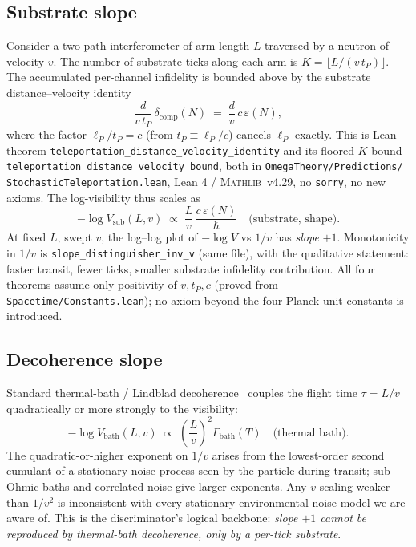 \documentclass[aps,prl,twocolumn,superscriptaddress,nofootinbib,10pt]{revtex4-2}
\newcommand{\lP}{\ell_P}
\newcommand{\tP}{t_P}
\newcommand{\eps}{\varepsilon}
\newcommand{\dcomp}{\delta_{\mathrm{comp}}}
\newcommand{\mathlibv}{\textsc{Mathlib}~v4.29}
\begin{document}
\subsection{Substrate slope}
Consider a two-path interferometer of arm length $L$ traversed by a
neutron of velocity $v$. The number of substrate ticks along each arm
is $K = \lfloor L/(v\,\tP)\rfloor$. The accumulated per-channel
infidelity is bounded above by the substrate distance--velocity
identity
\begin{equation}
  \frac{d}{v\,\tP}\,\dcomp(N) \;=\; \frac{d}{v}\,c\,\eps(N),
\end{equation}
where the factor $\lP/\tP = c$ (from $\tP \equiv \lP/c$) cancels
$\lP$ exactly. This is Lean theorem
\texttt{teleportation\_distance\_velocity\_identity} and its
floored-$K$ bound \texttt{teleportation\_distance\_velocity\_bound},
both in \texttt{OmegaTheory/Predictions/}
\texttt{StochasticTeleportation.lean}, Lean 4 / \mathlibv, no
\texttt{sorry}, no new axioms.  The log-visibility thus scales as
\begin{equation}
  -\log V_{\mathrm{sub}}(L, v) \;\propto\;
    \frac{L}{v}\,\frac{c\,\eps(N)}{\hbar}
    \quad \text{(substrate, shape)}.
\end{equation}
At fixed $L$, swept $v$, the log--log plot of $-\log V$ vs $1/v$ has
\emph{slope} $+1$.  Monotonicity in $1/v$ is
\texttt{slope\_distinguisher\_inv\_v} (same file), with the
qualitative statement: faster transit, fewer ticks, smaller substrate
infidelity contribution.  All four theorems assume only positivity of
$v, \tP, c$ (proved from \texttt{Spacetime/Constants.lean}); no axiom
beyond the four Planck-unit constants is introduced.

\subsection{Decoherence slope}
Standard thermal-bath / Lindblad decoherence~\cite{Diosi1984,Penrose1996}
couples the flight time $\tau = L/v$ quadratically or more strongly
to the visibility:
\begin{equation}
  -\log V_{\mathrm{bath}}(L, v) \;\propto\;
  \left(\frac{L}{v}\right)^{2} \Gamma_{\mathrm{bath}}(T)
  \quad \text{(thermal bath)}.
\end{equation}
The quadratic-or-higher exponent on $1/v$ arises from the lowest-order
second cumulant of a stationary noise process seen by the particle
during transit; sub-Ohmic baths and correlated noise give larger
exponents. Any $v$-scaling weaker than $1/v^{2}$ is inconsistent with
every stationary environmental noise model we are aware of.  This is
the discriminator's logical backbone: \emph{slope $+1$ cannot be
reproduced by thermal-bath decoherence, only by a per-tick
substrate}.
\end{document}

